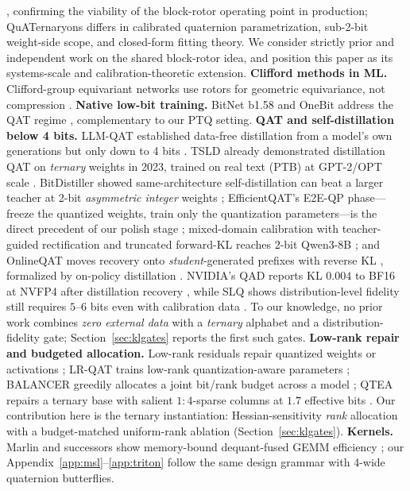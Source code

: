 \documentclass{article}
\begin{document}
\citep{lui2026rotaryquant}, confirming the viability of the block-rotor
operating point in production; QuATernaryons differs in calibrated quaternion
parametrization, sub-2-bit weight-side scope, and closed-form fitting theory.
We consider
\citep{ji2026isoquant} strictly prior and independent work on the shared
block-rotor idea, and position this paper as its systems-scale and
calibration-theoretic extension. \textbf{Clifford methods in ML.} Clifford-group
equivariant networks use rotors for geometric equivariance, not compression
\citep{ruhe2023clifford}. \textbf{Native low-bit training.}
BitNet b1.58 and OneBit address the QAT regime
\citep{wang2025bitnet,xu2024onebit}, complementary to our PTQ setting.
\textbf{QAT and self-distillation below 4 bits.} LLM-QAT established
data-free distillation from a model's own generations but only down to
4 bits \citep{liu2024llmqat}. TSLD already demonstrated distillation
QAT on \emph{ternary} weights in 2023, trained on real text (PTB) at
GPT-2/OPT scale \citep{kim2023tsld}. BitDistiller showed
same-architecture self-distillation can beat a larger teacher at 2-bit
\emph{asymmetric integer} weights \citep{du2024bitdistiller};
EfficientQAT's E2E-QP phase---freeze the quantized weights, train only
the quantization parameters---is the direct precedent of our polish
stage \citep{chen2025efficientqat}; mixed-domain calibration with
teacher-guided rectification and truncated forward-KL reaches 2-bit
Qwen3-8B \citep{okoshi2026reasoningqat}; and OnlineQAT moves recovery
onto \emph{student}-generated prefixes with reverse KL
\citep{wang2026onlineqat}, formalized by on-policy distillation
\citep{agarwal2024gkd}. NVIDIA's QAD reports KL $0.004$ to BF16 at
NVFP4 after distillation recovery \citep{xin2026qad}, while SLQ shows
distribution-level fidelity still requires $5$--$6$ bits even with
calibration data \citep{helcig2026slq}. To our knowledge, no prior work
combines \emph{zero external data} with a \emph{ternary} alphabet and a
distribution-fidelity gate; Section~\ref{sec:klgates} reports the first
such gates. \textbf{Low-rank repair and budgeted allocation.} Low-rank
residuals repair quantized weights \citep{saxena2025resq} or activations
\citep{scetbon2024lrc}; LR-QAT trains low-rank quantization-aware
parameters \citep{bondarenko2024lrqat}; BALANCER greedily allocates a
joint bit/rank budget across a model \citep{fan2026balancer}; QTEA
repairs a ternary base with salient $1{:}4$-sparse columns at $1.7$
effective bits \citep{guo2026qtea}. Our contribution here is the
ternary instantiation: Hessian-sensitivity \emph{rank} allocation with
a budget-matched uniform-rank ablation (Section~\ref{sec:klgates}).
\textbf{Kernels.} Marlin and successors show memory-bound dequant-fused GEMM
efficiency \citep{frantar2024marlin}; our Appendix~\ref{app:msl}--\ref{app:triton}
follow the same design grammar with 4-wide quaternion butterflies.
\end{document}
